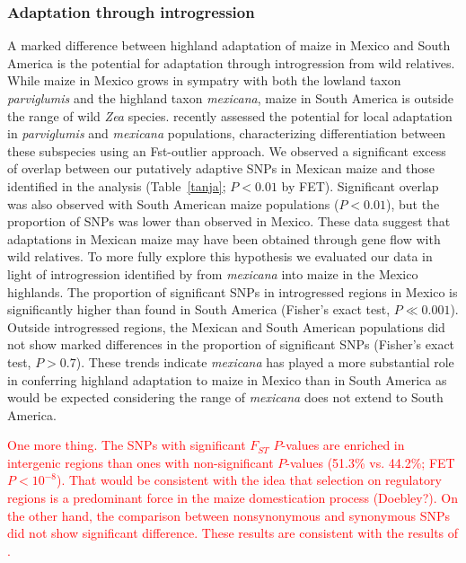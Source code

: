 {{\subsubsection{Adaptation through introgression}

 A marked difference between highland adaptation of maize in Mexico and South America is the potential for adaptation through introgression from wild relatives.  While maize in Mexico grows in sympatry with both the lowland taxon \emph{parviglumis} and the highland taxon \emph{mexicana}, maize in South America is outside the range of wild \emph{Zea} species.
 \cite{Pyhajarvi2013} recently assessed the potential for local adaptation in \emph{parviglumis} and \emph{mexicana} populations, characterizing differentiation between these subspecies using an Fst-outlier approach.
We observed a significant excess of overlap between our putatively adaptive SNPs in Mexican maize and those identified in the \cite{Pyhajarvi2013} analysis (Table~\ref{tanja}; $P<0.01$ by FET).
Significant overlap was also observed with South American maize populations ($P<0.01$), but the proportion of SNPs was lower than observed in Mexico.  These data suggest that adaptations in Mexican maize may have been obtained through gene flow with wild relatives.  To more fully explore this hypothesis we evaluated our data in light of introgression identified by \cite{Profford_2013} from \emph{mexicana} into maize in the Mexico highlands.  
The proportion of significant SNPs in introgressed regions in Mexico is significantly higher than found in South America (Fisher's exact test, $P\ll0.001$).
Outside introgressed regions, the Mexican and South American populations did not show marked differences in the proportion of significant SNPs (Fisher's exact test, $P>0.7$). %
These trends indicate \emph{mexicana} has played a more substantial role in conferring highland adaptation to maize in Mexico than in South America as would be expected considering the range of \emph{mexicana} does not extend to South America.

\textcolor{red}{One more thing.  The SNPs with significant $F_{ST}$ $P$-values are enriched in intergenic regions than ones with non-significant $P$-values (51.3\% vs. 44.2\%; FET $P < 10^{-8}$).  That would be consistent with the idea that selection on regulatory regions is a predominant force in the maize domestication process (Doebley?). On the other hand, the comparison between nonsynonymous and synonymous SNPs did not show significant difference.  These results are consistent with the results of \cite{Pyhajarvi2013}.}

}}
